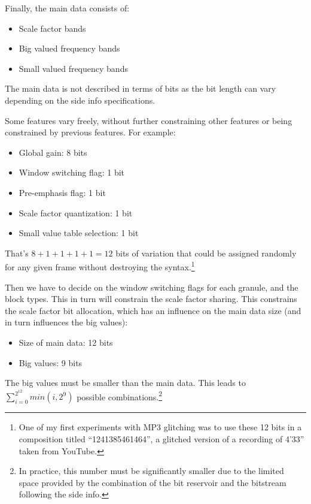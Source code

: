 \documentclass{thesis}
\begin{document}
	Finally, the main data consists of:
	
\begin{itemize}
	\item Scale factor bands
	\item Big valued frequency bands
	\item Small valued frequency bands
\end{itemize}

	The main data is not described in terms of bits as the bit length can vary depending on the side info specifications.

	Some features vary freely, without further constraining other features or being constrained by previous features. For example:

\begin{itemize}
	\item Global gain: 8 bits
	\item Window switching flag: 1 bit
	\item Pre-emphasis flag: 1 bit
	\item Scale factor quantization: 1 bit
	\item Small value table selection: 1 bit
\end{itemize}

	That's $8+1+1+1+1=12$ bits of variation that could be assigned randomly for any given frame without destroying the syntax.\footnote{One of my first experiments with MP3 glitching was to use these 12 bits in a composition titled ``1241385461464'', a glitched version of a recording of 4'33'' taken from YouTube.}
	
	Then we have to decide on the window switching flags for each granule, and the block types. This in turn will constrain the scale factor sharing. This constrains the scale factor bit allocation, which has an influence on the main data size (and in turn influences the big values):
	
\begin{itemize}
	\item Size of main data: 12 bits
	\item Big values: 9 bits
\end{itemize}

	The big values must be smaller than the main data. This leads to $\sum_{i=0}^{2^{12}} min(i,2^9)$ possible combinations.\footnote{In practice, this number must be significantly smaller due to the limited space provided by the combination of the bit reservoir and the bitstream following the side info.}
	
\end{document}
